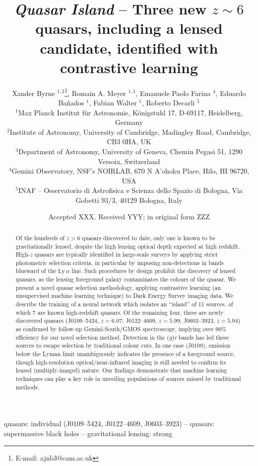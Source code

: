 \documentclass[fleqn,usenatbib]{mnras}
\title[
    \textit{Quasar Island} -- Three new $z\sim$ 6 quasars
]{
    \textit{Quasar Island} -- Three new $z\sim6$ quasars, including a lensed candidate, identified with contrastive learning
}
\author[X. Byrne et\ al.]{
Xander Byrne
$^{1,2}$\thanks{E-mail: ajnb3@cam.ac.uk},
Romain A. Meyer
$^{1,3}$,
Emanuele Paolo Farina
$^{4}$,
Eduardo Ba\~{n}ados
$^{1}$,
\newauthor
Fabian Walter
$^{1}$,
Roberto Decarli
$^{5}$
\\
$^{1}$Max Planck Institut f\"{u}r Astronomie, K\"{o}nigstuhl 17, D-69117, Heidelberg, Germany\\
$^{2}$Institute of Astronomy, University of Cambridge, Madingley Road, Cambridge, CB3 0HA, UK\\
$^{3}$Department of Astronomy, University of Geneva, Chemin Pegasi 51, 1290 Versoix, Switzerland\\
$^{4}$Gemini Observatory, NSF's NOIRLAB, 670 N A'ohoku Place, Hilo, HI 96720, USA\\
$^{5}$INAF -- Osservatorio di Astrofisica e Scienza dello Spazio di Bologna, Via Gobetti 93/3, 40129 Bologna, Italy
}
\date{Accepted XXX. Received YYY; in original form ZZZ}
\begin{document}
\label{firstpage}
\pagerange{\pageref{firstpage}--\pageref{lastpage}}
\maketitle

\begin{abstract}
Of the hundreds of $z>6$ quasars discovered to date, only one is known to be gravitationally lensed, despite the high lensing optical depth expected at high redshift.
High-$z$ quasars are typically identified in large-scale surveys by applying strict photometric selection criteria, in particular by imposing non-detections in bands blueward of the $\text{Ly}\,\alpha$ line.
Such procedures by design prohibit the discovery of lensed quasars, as the lensing foreground galaxy contaminates the colours of the quasar.
We present a novel quasar selection methodology, applying contrastive learning (an unsupervised machine learning technique) to Dark Energy Survey imaging data.
We describe the training of a neural network which isolates an ``island'' of 11 sources, of which 7 are known high-redshift quasars.
Of the remaining four, three are newly discovered quasars (J0109--5424, $z=6.07$; J0122--4609, $z=5.99$; J0603--3923, $z=5.94$) as confirmed by follow-up Gemini-South/GMOS spectroscopy, implying over 90\% efficiency for our novel selection method.
Detection in the (\textit{g})\textit{r} bands has led these sources to escape selection by traditional colour cuts.
In one case (J0109), emission below the Lyman limit unambiguously indicates the presence of a foreground source, though high-resolution optical/near-infrared imaging is still needed to confirm its lensed (multiply-imaged) nature.
Our findings demonstrate that machine learning techniques can play a key role in unveiling populations of sources missed by traditional methods.
\end{abstract}

\begin{keywords}
quasars: individual (J0109--5424, J0122--4609, J0603--3923)
-- quasars: supermassive black holes
-- gravitational lensing: strong
\end{keywords}


\end{document}

